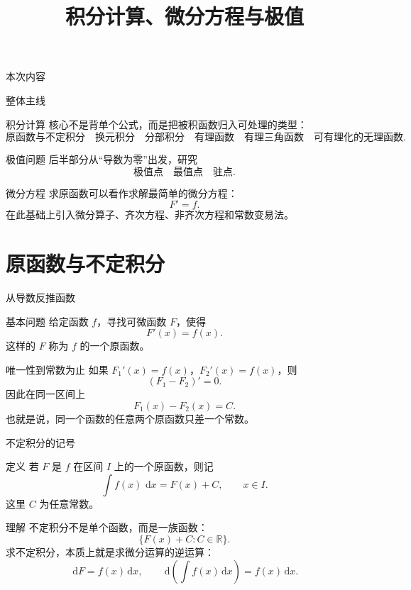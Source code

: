 \documentclass[aspectratio=169,10pt]{ctexbeamer}
\title{积分计算、微分方程与极值}
\subtitle{}
\author{}
\date{}
\newcommand{\R}{\mathbb{R}}
\newcommand{\dd}{\,\mathrm{d}}
\begin{document}
\begin{frame}
  \titlepage
\end{frame}

\begin{frame}{本次内容}
\small
\tableofcontents
\end{frame}

\begin{frame}[t]{整体主线}
\small
\begin{block}{积分计算}
核心不是背单个公式，而是把被积函数归入可处理的类型：
\[
\text{原函数与不定积分}\quad
\text{换元积分}\quad
\text{分部积分}\quad
\text{有理函数}\quad
\text{有理三角函数}\quad
\text{可有理化的无理函数}.
\]
\end{block}

\begin{block}{极值问题}
后半部分从“导数为零”出发，研究
\[
\text{极值点}\quad
\text{最值点}\quad
\text{驻点}.
\]
\end{block}

\begin{block}{微分方程}
求原函数可以看作求解最简单的微分方程：
\[
  F'=f.
\]
在此基础上引入微分算子、齐次方程、非齐次方程和常数变易法。
\end{block}
\end{frame}

\section{原函数与不定积分}

\begin{frame}[t]{从导数反推函数}
\small
\begin{block}{基本问题}
给定函数 $f$，寻找可微函数 $F$，使得
\[
  F'(x)=f(x).
\]
这样的 $F$ 称为 $f$ 的一个原函数。
\end{block}

\begin{block}{唯一性到常数为止}
如果 $F_1'(x)=f(x)$，$F_2'(x)=f(x)$，则
\[
  (F_1-F_2)'=0.
\]
因此在同一区间上
\[
  F_1(x)-F_2(x)=C.
\]
也就是说，同一个函数的任意两个原函数只差一个常数。
\end{block}
\end{frame}

\begin{frame}[t]{不定积分的记号}
\small
\begin{block}{定义}
若 $F$ 是 $f$ 在区间 $I$ 上的一个原函数，则记
\[
  \int f(x)\,\dd x=F(x)+C,\qquad x\in I.
\]
这里 $C$ 为任意常数。
\end{block}

\begin{block}{理解}
不定积分不是单个函数，而是一族函数：
\[
  \{F(x)+C:C\in\R\}.
\]
求不定积分，本质上就是求微分运算的逆运算：
\[
  \dd F=f(x)\dd x,\qquad
  \dd\!\left(\int f(x)\dd x\right)=f(x)\dd x.
\]
\end{block}
\end{frame}
\end{document}
